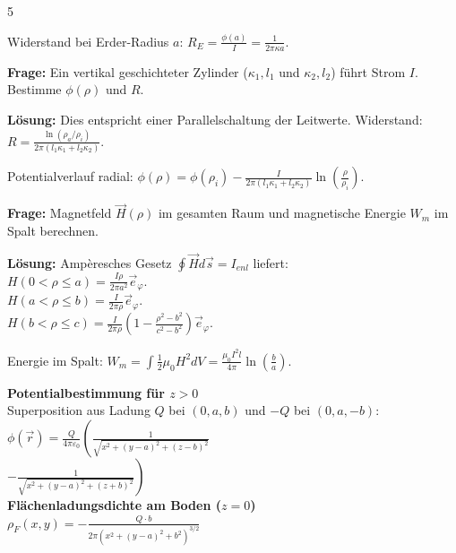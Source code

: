 \documentclass[a4paper, 2pt, landscape]{extarticle}
\begin{document}
\begin{multicols*}{5}
\begin{tcolorbox}[title={Aufgabe 4: Kugelerder I (Blatt 5)}]
Widerstand bei Erder-Radius $a$: 
$R_E = \frac{\phi(a)}{I} = \frac{1}{2\pi \kappa a}$.
\end{tcolorbox}

\begin{tcolorbox}[title={Aufgabe 4: Geschichteter Zylinder (Blatt 8)}]
\textbf{Frage:} Ein vertikal geschichteter Zylinder ($\kappa_1, l_1$ und $\kappa_2, l_2$) führt Strom $I$. Bestimme $\phi(\rho)$ und $R$.

\textbf{Lösung:}
Dies entspricht einer Parallelschaltung der Leitwerte.
Widerstand: $R = \frac{\ln(\rho_a/\rho_i)}{2\pi(l_1 \kappa_1 + l_2 \kappa_2)}$.

Potentialverlauf radial: 
$\phi(\rho) = \phi(\rho_i) - \frac{I}{2\pi(l_1 \kappa_1 + l_2 \kappa_2)} \ln(\frac{\rho}{\rho_i})$.
\end{tcolorbox}

\begin{tcolorbox}[title={Aufgabe 5: Koaxialkabel (Blatt 6)}]
\textbf{Frage:} Magnetfeld $\vec{H}(\rho)$ im gesamten Raum und magnetische Energie $W_m$ im Spalt berechnen.

\textbf{Lösung:}
Ampèresches Gesetz $\oint \vec{H} d\vec{s} = I_{enl}$ liefert: \\
$H(0 < \rho \le a) = \frac{I \rho}{2\pi a^2} \vec{e}_\varphi$. \\
$H(a < \rho \le b) = \frac{I}{2\pi \rho} \vec{e}_\varphi$. \\
$H(b < \rho \le c) = \frac{I}{2\pi \rho} (1 - \frac{\rho^2 - b^2}{c^2 - b^2}) \vec{e}_\varphi$.

Energie im Spalt: 
$W_m = \int \frac{1}{2} \mu_0 H^2 dV = \frac{\mu_0 I^2 l}{4\pi} \ln(\frac{b}{a})$.
\end{tcolorbox}

\begin{tcolorbox}[title={Spiegelung: Punktladung über geerdeter Ebene (Blatt 4)}, colback=white, colframe=black]
\textbf{Potentialbestimmung für $z > 0$} \\
Superposition aus Ladung $Q$ bei $(0, a, b)$ und $-Q$ bei $(0, a, -b)$:
$\phi(\vec{r}) = \frac{Q}{4\pi\varepsilon_0} \left( \frac{1}{\sqrt{x^2 + (y-a)^2 + (z-b)^2}} \right. $ \\
$\left. - \frac{1}{\sqrt{x^2 + (y-a)^2 + (z+b)^2}} \right)$\\
\textbf{Flächenladungsdichte am Boden ($z=0$)} \\
$\rho_F(x, y) = -\frac{Q \cdot b}{2\pi (x^2 + (y-a)^2 + b^2)^{3/2}}$
\end{tcolorbox}


\end{multicols*}
\end{document}
